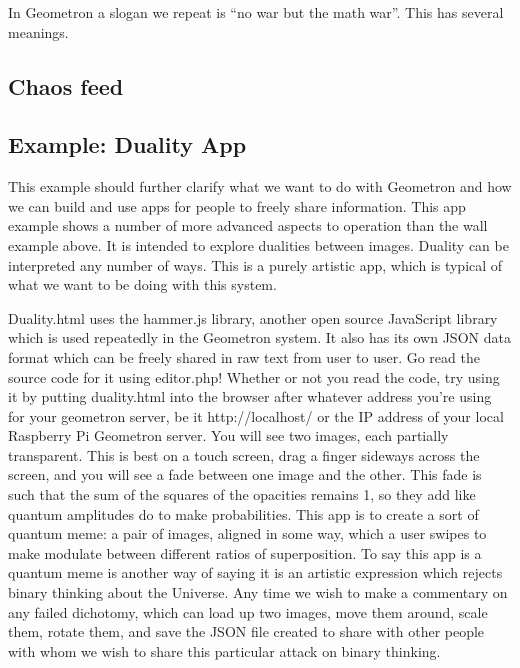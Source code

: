 In Geometron a slogan we repeat is ``no war but the math war''.  This has several meanings.

\subsection{Chaos feed}

\subsection{Example: Duality App}

This example should further clarify what we want to do with Geometron and how we can build and use apps for people to freely share information.  This app example shows a number of more advanced aspects to operation than the wall example above. It is intended to explore dualities between images.  Duality can be interpreted any number of ways.  This is a purely artistic app, which is typical of what we want to be doing with this system.  

Duality.html uses the hammer.js library, another open source JavaScript library which is used repeatedly in the Geometron system.  It also has its own JSON data format which can be freely shared in raw text from user to user.  Go read the source code for it using editor.php!  Whether or not you read the code, try using it by putting duality.html into the browser after whatever address you're using for your geometron server, be it http://localhost/ or the IP address of your local Raspberry Pi Geometron server.  You will see two images, each partially transparent. This is best on a touch screen, drag a finger sideways across the screen, and you will see a fade between one image and the other. This fade is such that the sum of the squares of the opacities remains 1, so they add like quantum amplitudes do to make probabilities.  This app is to create a sort of quantum meme: a pair of images, aligned in some way, which a user swipes to make modulate between different ratios of superposition. To say this app is a quantum meme is another way of saying it is an artistic expression which rejects binary thinking about the Universe.  Any time we wish to make a commentary on any failed dichotomy, which can load up two images, move them around, scale them, rotate them, and save the JSON file created to share with other people with whom we wish to share this particular attack on binary thinking.


